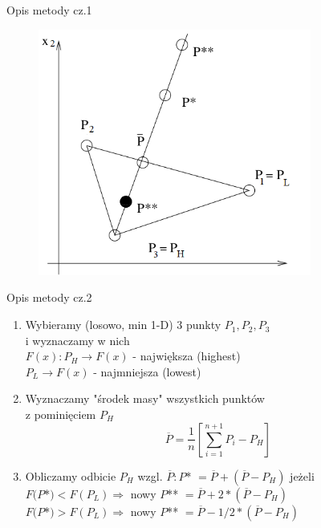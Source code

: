   \begin{frame}{Opis metody cz.1}

  	\begin{figure}
		\centering
		\includegraphics[height=0.8\textheight ,width=0.8\textwidth]{img/17/simplex_method}
	\end{figure}

  \end{frame}

  \begin{frame}{Opis metody cz.2}

	\begin{enumerate}
		\item Wybieramy (losowo, min 1-D) 3 punkty $P_1,P_2,P_3$
		\\i wyznaczamy w nich
		\\ $F(x): P_H \rightarrow F(x)$ - największa (highest)
		\\ $P_L \rightarrow F(x)$ - najmniejsza (lowest)
		\item Wyznaczamy "środek masy" wszystkich punktów
		\\z pominięciem $P_H$
		  \begin{displaymath}
		    \overline{P}=\frac{1}{n}\left[\sum_{i=1}^{n+1}P_i-P_H\right]
		  \end{displaymath}
		\item Obliczamy odbicie $P_H$ wzgl. $\overline{P} : P$* $= \overline{P}+(\overline{P}-P_H)$ jeżeli
		\\ $F(P$*$) < F(P_L) \Rightarrow$ nowy $P$** $= \overline{P}+2*(\overline{P}-P_H)$
		\\ $F(P$*$) > F(P_L) \Rightarrow$ nowy $P$** $= \overline{P}-1/2*(\overline{P}-P_H)$
		\setcounter{saveenumi}{\value{enumi}}
	\end{enumerate}

  \end{frame}


